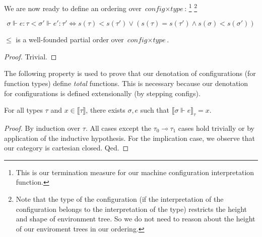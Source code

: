 \begin{definition}[Orderings]
  We are now ready to define an ordering over $\textit{config} \times
  \textit{type}$:
  \footnote{This is our termination measure for our machine configuration
  interpretation function.}
  \footnote{Note that the type of the configuration (if the interpretation of
  the configuration belongs to the interpretation of the type) restricts the
  height and shape of environment tree. So we do not need to reason about the
  height of our enviroment trees in our ordering.}

  \begin{equation}
    \sigma \Vdash e : \tau < \sigma' \Vdash e' : \tau' \iff
    s(\tau) < s(\tau') \lor (s(\tau) = s(\tau') \land s(\sigma) < s(\sigma'))
  \end{equation}

\end{definition}

\begin{lemma}
  $\leq$ is a well-founded partial order over $\textit{config} \times
  \textit{type}$.
\end{lemma}
\begin{proof}
  Trivial.
\end{proof}


The following property is used to prove that our denotation of configurations
(for function types) define \textit{total} functions. This is necessary because
our denotation for configurations is defined extensionally (by stepping
configs).

\begin{lemma}
  For all types $\tau$ and $x \in \llbracket \tau \rrbracket$, there exists
  $\sigma, e$ such that $\llbracket \sigma \Vdash e \rrbracket_{\tau} = x$.
\end{lemma}
\begin{proof}
  By induction over $\tau$. All cases except the $\tau_0 \multimap \tau_1$ cases
  hold trivially or by application of the inductive hypothesis. For the
  implication case, we observe that our category is cartesian closed. Qed.
\end{proof}


